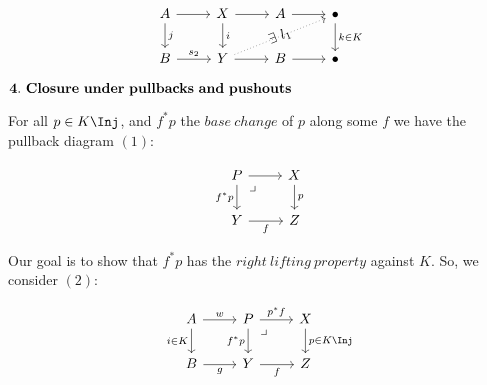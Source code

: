 \begin{prf}
            \[\begin{tikzcd}
                A & X & A & \bullet \\
                B & Y & B & \bullet
                \arrow["{k\in K}", from=1-4, to=2-4]
                \arrow[from=1-3, to=1-4]
                \arrow[from=2-3, to=2-4]
                \arrow[from=1-2, to=1-3]
                \arrow[from=2-2, to=2-3]
                \arrow["i", from=1-2, to=2-2]
                \arrow[from=1-1, to=1-2]
                \arrow["j", from=1-1, to=2-1]
                \arrow["{s_2}", from=2-1, to=2-2]
                \arrow["{\E\ l_1}"{marking}, dotted, from=2-2, to=1-4]
            \end{tikzcd}\]

        \par $\mbf{4.\ Closure\ under\ pullbacks\ and\ pushouts}$\\

            \par For all $p \in K \Inj$, and $f^* p$ the $base\ change$ of $p$ along some $f$
            we have the pullback diagram $(1)$:

            \[\begin{tikzcd}
                P & X \\
                Y & Z
                \arrow["f"', from=2-1, to=2-2]
                \arrow["p", from=1-2, to=2-2]
                \arrow["{f^*p}"', from=1-1, to=2-1]
                \arrow[from=1-1, to=1-2]
                \arrow["{\big \lrcorner}"{anchor=center, pos=0.125}, draw=none, from=1-1, to=2-2]
            \end{tikzcd}\]

            \par Our goal is to show that $f^* p$ has the $right\ lifting\ property$ against $K$.
            So, we consider $(2)$:

            \[\begin{tikzcd}
                A & P & X \\
                B & Y & Z
                \arrow["f"', from=2-2, to=2-3]
                \arrow["{p \in K \Inj}", from=1-3, to=2-3]
                \arrow["{f^*p}"', from=1-2, to=2-2]
                \arrow["p^*f", from=1-2, to=1-3]
                \arrow["{\big \lrcorner}"{anchor=center, pos=0.125}, draw=none, from=1-2, to=2-3]
                \arrow["g"',from=2-1, to=2-2]
                \arrow["w", from=1-1, to=1-2]
                \arrow["{{i \in K}}"', from=1-1, to=2-1]
            \end{tikzcd}\]


\end{prf}
